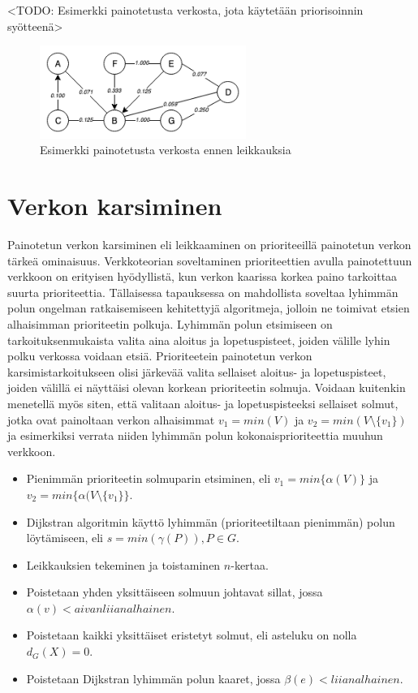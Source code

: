   <TODO: Esimerkki painotetusta verkosta, jota käytetään priorisoinnin syötteenä>
  \begin{figure}[H]
    \centering
    \includegraphics[width=0.6\textwidth]{assets/painotettu-verkko-ennen.png}
    \caption{Esimerkki painotetusta verkosta ennen leikkauksia}
    \label{fig:painotettu-verkko-ennen}
  \end{figure}

\section{Verkon karsiminen} \label{ch:10_verkon_karsiminen}

  Painotetun verkon karsiminen eli leikkaaminen on prioriteeillä painotetun verkon tärkeä ominaisuus.
  Verkkoteorian soveltaminen prioriteettien avulla painotettuun verkkoon on erityisen hyödyllistä, kun verkon kaarissa korkea paino tarkoittaa suurta prioriteettia.
  Tällaisessa tapauksessa on mahdollista soveltaa lyhimmän polun ongelman ratkaisemiseen kehitettyjä algoritmeja, jolloin ne toimivat etsien alhaisimman prioriteetin polkuja.
  Lyhimmän polun etsimiseen on tarkoituksenmukaista valita aina aloitus ja lopetuspisteet, joiden välille lyhin polku verkossa voidaan etsiä.
  Prioriteetein painotetun verkon karsimistarkoitukseen olisi järkevää valita sellaiset aloitus- ja lopetuspisteet, joiden välillä ei näyttäisi olevan korkean prioriteetin solmuja.
  Voidaan kuitenkin menetellä myös siten, että valitaan aloitus- ja lopetuspisteeksi sellaiset solmut, jotka ovat painoltaan verkon alhaisimmat \(v_1 = min(V)\) ja \(v_2 = min(V \setminus \{v_1\})\) ja esimerkiksi verrata niiden lyhimmän polun kokonaisprioriteettia muuhun verkkoon.

  \begin{itemize}
    \item Pienimmän prioriteetin solmuparin etsiminen, eli \(v_1 = min\{ \alpha(V) \}\) ja \(v_2 = min\{\alpha( V \setminus \{v_1\} \}\).
    \item Dijkstran algoritmin käyttö lyhimmän (prioriteetiltaan pienimmän) polun löytämiseen, eli \(s = min( \gamma(P) ), P \in G\).
    \item Leikkauksien tekeminen ja toistaminen \(n\)-kertaa.
    \item Poistetaan yhden yksittäiseen solmuun johtavat sillat, jossa \(\alpha(v) < aivan liian alhainen \).
    \item Poistetaan kaikki yksittäiset eristetyt solmut, eli asteluku on nolla \(d_G(X) = 0\).
    \item Poistetaan Dijkstran lyhimmän polun kaaret, jossa \(\beta(e) < liian alhainen \).
  \end{itemize}

